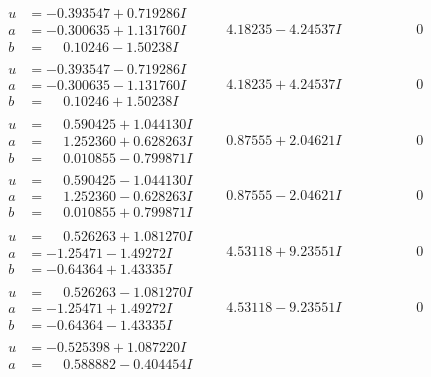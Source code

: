 \documentclass[1p]{elsarticle_modified}
\theoremstyle{definition}
\begin{document}
$$\begin{array}{c|c|c}
 \hline 
\begin{aligned}
u &= -0.393547 + 0.719286 I \\
a &= -0.300635 + 1.131760 I \\
b &= \phantom{-}0.10246 - 1.50238 I\end{aligned}
 & \phantom{-}4.18235 - 4.24537 I & \phantom{-0.000000 } 0 \\ \hline\begin{aligned}
u &= -0.393547 - 0.719286 I \\
a &= -0.300635 - 1.131760 I \\
b &= \phantom{-}0.10246 + 1.50238 I\end{aligned}
 & \phantom{-}4.18235 + 4.24537 I & \phantom{-0.000000 } 0 \\ \hline\begin{aligned}
u &= \phantom{-}0.590425 + 1.044130 I \\
a &= \phantom{-}1.252360 + 0.628263 I \\
b &= \phantom{-}0.010855 - 0.799871 I\end{aligned}
 & \phantom{-}0.87555 + 2.04621 I & \phantom{-0.000000 } 0 \\ \hline\begin{aligned}
u &= \phantom{-}0.590425 - 1.044130 I \\
a &= \phantom{-}1.252360 - 0.628263 I \\
b &= \phantom{-}0.010855 + 0.799871 I\end{aligned}
 & \phantom{-}0.87555 - 2.04621 I & \phantom{-0.000000 } 0 \\ \hline\begin{aligned}
u &= \phantom{-}0.526263 + 1.081270 I \\
a &= -1.25471 - 1.49272 I \\
b &= -0.64364 + 1.43335 I\end{aligned}
 & \phantom{-}4.53118 + 9.23551 I & \phantom{-0.000000 } 0 \\ \hline\begin{aligned}
u &= \phantom{-}0.526263 - 1.081270 I \\
a &= -1.25471 + 1.49272 I \\
b &= -0.64364 - 1.43335 I\end{aligned}
 & \phantom{-}4.53118 - 9.23551 I & \phantom{-0.000000 } 0 \\ \hline\begin{aligned}
u &= -0.525398 + 1.087220 I \\
a &= \phantom{-}0.588882 - 0.404454 I \\

\end{aligned}
\end{array}$$
\end{document}
